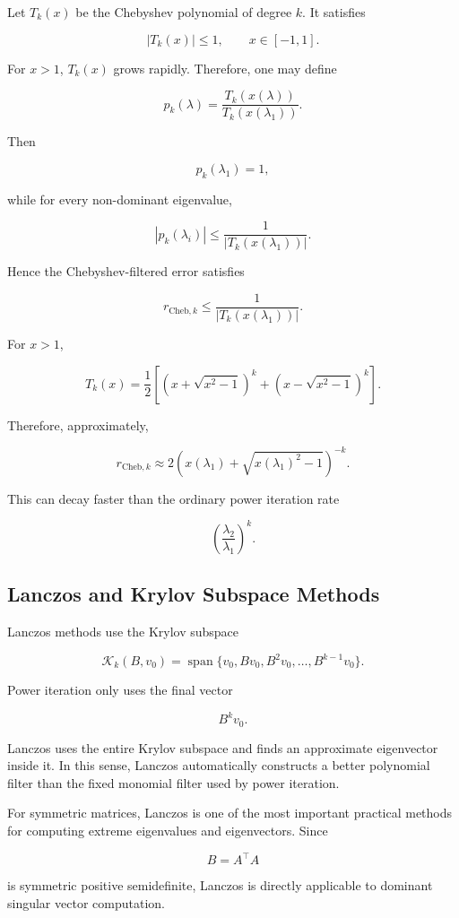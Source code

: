 \documentclass{article}
\begin{document}
Let \(T_k(x)\) be the Chebyshev polynomial of degree \(k\). It satisfies

\[
|T_k(x)|\le 1,
\qquad x\in[-1,1].
\]

For \(x>1\), \(T_k(x)\) grows rapidly. Therefore, one may define

\[
p_k(\lambda)
=
\frac{T_k(x(\lambda))}
{T_k(x(\lambda_1))}.
\]

Then

\[
p_k(\lambda_1)=1,
\]

while for every non-dominant eigenvalue,

\[
|p_k(\lambda_i)|
\le
\frac{1}{|T_k(x(\lambda_1))|}.
\]

Hence the Chebyshev-filtered error satisfies

\[
r_{\mathrm{Cheb},k}
\le
\frac{1}{|T_k(x(\lambda_1))|}.
\]

For \(x>1\),

\[
T_k(x)
=
\frac{1}{2}
\left[
\left(x+\sqrt{x^2-1}\right)^k
+
\left(x-\sqrt{x^2-1}\right)^k
\right].
\]

Therefore, approximately,

\[
r_{\mathrm{Cheb},k}
\approx
2
\left(
x(\lambda_1)+\sqrt{x(\lambda_1)^2-1}
\right)^{-k}.
\]

This can decay faster than the ordinary power iteration rate

\[
\left(\frac{\lambda_2}{\lambda_1}\right)^k.
\]

\subsection{Lanczos and Krylov Subspace Methods}

Lanczos methods use the Krylov subspace

\[
\mathcal{K}_k(B,v_0)
=
\operatorname{span}
\{v_0,Bv_0,B^2v_0,\ldots,B^{k-1}v_0\}.
\]

Power iteration only uses the final vector

\[
B^k v_0.
\]

Lanczos uses the entire Krylov subspace and finds an approximate eigenvector inside it. In this sense, Lanczos automatically constructs a better polynomial filter than the fixed monomial filter used by power iteration.

For symmetric matrices, Lanczos is one of the most important practical methods for computing extreme eigenvalues and eigenvectors. Since

\[
B=A^\top A
\]

is symmetric positive semidefinite, Lanczos is directly applicable to dominant singular vector computation.
\end{document}
